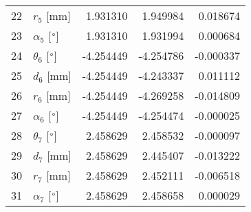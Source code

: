 \documentclass{standalone}%
\begin{document}
\begin{tabular}{llrrr}
22 &              $r_{5}$ [mm] &  1.931310 &   1.949984 &   0.018674 \\
23 &  $\alpha_{5}$ [$\degree$] &  1.931310 &   1.931994 &   0.000684 \\
24 &  $\theta_{6}$ [$\degree$] & -4.254449 &  -4.254786 &  -0.000337 \\
25 &              $d_{6}$ [mm] & -4.254449 &  -4.243337 &   0.011112 \\
26 &              $r_{6}$ [mm] & -4.254449 &  -4.269258 &  -0.014809 \\
27 &  $\alpha_{6}$ [$\degree$] & -4.254449 &  -4.254474 &  -0.000025 \\
28 &  $\theta_{7}$ [$\degree$] &  2.458629 &   2.458532 &  -0.000097 \\
29 &              $d_{7}$ [mm] &  2.458629 &   2.445407 &  -0.013222 \\
30 &              $r_{7}$ [mm] &  2.458629 &   2.452111 &  -0.006518 \\
31 &  $\alpha_{7}$ [$\degree$] &  2.458629 &   2.458658 &   0.000029 \\
\bottomrule
\end{tabular}
%
\end{document}
